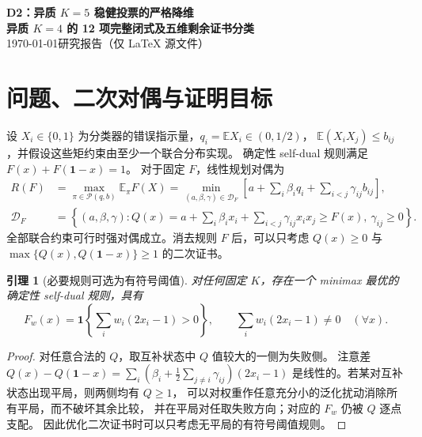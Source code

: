 \documentclass[11pt,a4paper]{ctexart}
\newtheorem{lemma}[theorem]{引理}
\theoremstyle{remark}\newtheorem{remark}[theorem]{备注}
\newcommand{\Rstar}[1]{R^*_{\mathrm{det},#1}}
\begin{document}
\begin{center}
{\Large\bfseries D2：异质 $K=5$ 稳健投票的严格降维}\\[.4em]
{\large\bfseries 异质 $K=4$ 的 12 项完整闭式及五维剩余证书分类}\\[.35em]
\today\qquad 研究报告（仅 \LaTeX{} 源文件）
\end{center}
\begin{abstract}
本文继续研究已知分类器边际错误概率与成对共同出错概率上界的
确定性 self-dual 稳健集成。新结果是\emph{计算机辅助但使用精确有理数证书的
异质四分类器完整闭式}：$\Rstar{4}$ 恰为 12 个显式仿射式的最小值。
证明同时穷尽 104 个必要阈值规则的 14 个置换类型、
262 个对偶极点和 262 份精确 Farkas 支配性证书。
结合解析的孤立交互变量消元定理，进一步严格证明：
对 $K=5$，所有二次交互支撑未覆盖全部五个顶点的证书都被
5 个边际项、22 个奇环项和 20 个四变量锚点项覆盖。
因此尚未完成的正截距部分只须考虑 17 种覆盖全部五顶点的
非二分交互支撑图。\textbf{本文不宣称已证明 $K=5$ 的最终简洁闭式。}
\end{abstract}

\section{问题、二次对偶与证明目标}
设 $X_i\in\{0,1\}$ 为分类器的错误指示量，$q_i=\mathbb E X_i\in(0,1/2)$，
$\mathbb E(X_iX_j)\le b_{ij}$，并假设这些矩约束由至少一个联合分布实现。
确定性 self-dual 规则满足 $F(x)+F(\mathbf1-x)=1$。
对于固定 $F$，线性规划对偶为
\begin{align}
R(F)&=\max_{\pi\in\mathcal P(q,b)}\mathbb E_\pi F(X)
=\min_{(a,\beta,\gamma)\in\mathcal D_F}
\left[a+\sum_i\beta_iq_i+\sum_{i<j}\gamma_{ij}b_{ij}\right],\\
\mathcal D_F&=\left\{(a,\beta,\gamma):
Q(x)=a+\sum_i\beta_ix_i+\sum_{i<j}\gamma_{ij}x_ix_j\ge F(x),\ \gamma_{ij}\ge0\right\}.
\end{align}
全部联合约束可行时强对偶成立。消去规则 $F$ 后，可以只考虑
$Q(x)\ge0$ 与 $\max\{Q(x),Q(\mathbf1-x)\}\ge1$ 的二次证书。

\begin{lemma}[必要规则可选为有符号阈值]
对任何固定 $K$，存在一个 minimax 最优的确定性 self-dual 规则，具有
\[
F_w(x)=\mathbf1\!\left\{\sum_iw_i(2x_i-1)>0\right\},
\qquad \sum_iw_i(2x_i-1)\ne0\quad(\forall x).
\]
\end{lemma}
\begin{proof}
对任意合法的 $Q$，取互补状态中 $Q$ 值较大的一侧为失败侧。
注意差
$Q(x)-Q(\mathbf1-x)=\sum_i
(\beta_i+\frac12\sum_{j\ne i}\gamma_{ij})(2x_i-1)$
是线性的。若某对互补状态出现平局，则两侧均有 $Q\ge1$，
可以对权重作任意充分小的泛化扰动消除所有平局，而不破坏其余比较，
并在平局对任取失败方向；对应的 $F_w$ 仍被 $Q$ 逐点支配。
因此优化二次证书时可以只考虑无平局的有符号阈值规则。
\end{proof}
\end{document}
